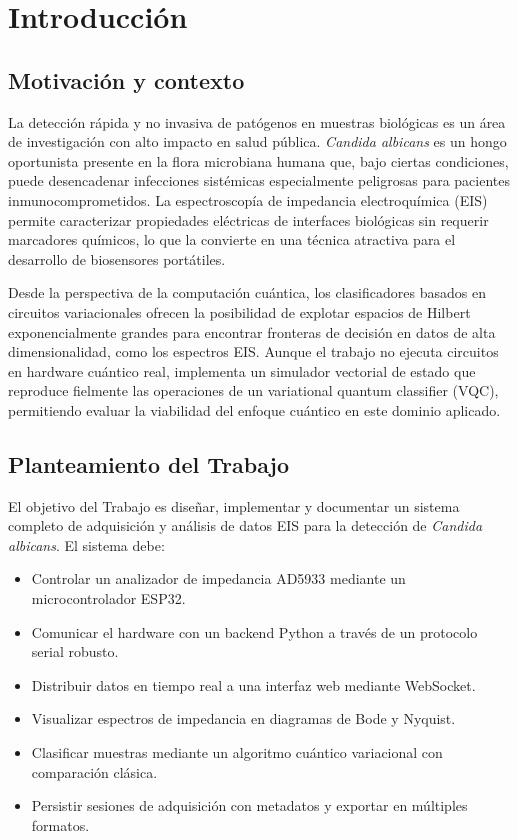 \documentclass[11pt,a4paper,spanish]{book}
\begin{document}
\mainmatter

\chapter{Introducci\'{o}n}

\section{Motivaci\'{o}n y contexto}

La detecci\'{o}n r\'{a}pida y no invasiva de pat\'{o}genos en muestras biol\'{o}gicas es un \'{a}rea de investigaci\'{o}n con alto impacto en salud p\'{u}blica. \textit{Candida albicans} es un hongo oportunista presente en la flora microbiana humana que, bajo ciertas condiciones, puede desencadenar infecciones sist\'{e}micas especialmente peligrosas para pacientes inmunocomprometidos. La espectroscop\'{i}a de impedancia electroqu\'{i}mica (EIS) permite caracterizar propiedades el\'{e}ctricas de interfaces biol\'{o}gicas sin requerir marcadores qu\'{i}micos, lo que la convierte en una t\'{e}cnica atractiva para el desarrollo de biosensores port\'{a}tiles.

Desde la perspectiva de la computaci\'{o}n cu\'{a}ntica, los clasificadores basados en circuitos variacionales ofrecen la posibilidad de explotar espacios de Hilbert exponencialmente grandes para encontrar fronteras de decisi\'{o}n en datos de alta dimensionalidad, como los espectros EIS. Aunque el trabajo no ejecuta circuitos en hardware cu\'{a}ntico real, implementa un simulador vectorial de estado que reproduce fielmente las operaciones de un variational quantum classifier (VQC), permitiendo evaluar la viabilidad del enfoque cu\'{a}ntico en este dominio aplicado.

\section{Planteamiento del Trabajo}

El objetivo del Trabajo es dise\~{n}ar, implementar y documentar un sistema completo de adquisici\'{o}n y an\'{a}lisis de datos EIS para la detecci\'{o}n de \textit{Candida albicans}. El sistema debe:
\begin{itemize}
	\item Controlar un analizador de impedancia AD5933 mediante un microcontrolador ESP32.
	\item Comunicar el hardware con un backend Python a trav\'{e}s de un protocolo serial robusto.
	\item Distribuir datos en tiempo real a una interfaz web mediante WebSocket.
	\item Visualizar espectros de impedancia en diagramas de Bode y Nyquist.
	\item Clasificar muestras mediante un algoritmo cu\'{a}ntico variacional con comparaci\'{o}n cl\'{a}sica.
	\item Persistir sesiones de adquisici\'{o}n con metadatos y exportar en m\'{u}ltiples formatos.
\end{itemize}
\end{document}
